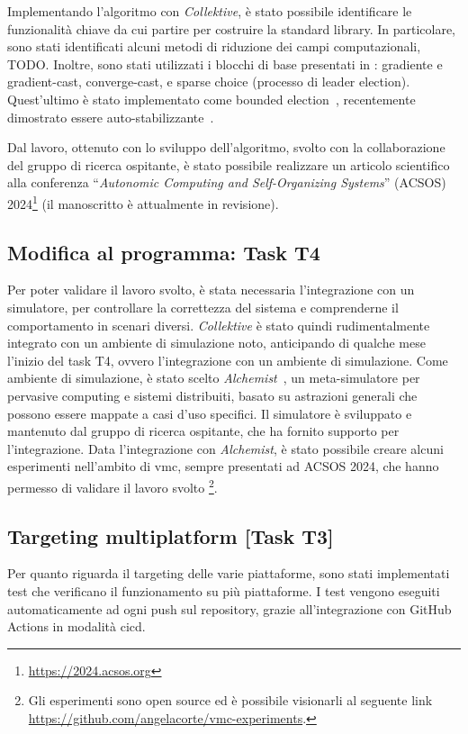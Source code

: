 \documentclass[13pt, a4paper]{article}
\newcommand{\ck}{\emph{Collektive}}
\begin{document}
Implementando l'algoritmo con \ck{},
è stato possibile identificare le funzionalità chiave da cui partire per costruire la standard library.
%
In particolare,
sono stati identificati alcuni metodi di riduzione dei campi computazionali, TODO.
%
Inoltre, sono stati utilizzati i blocchi di base presentati in \cite{TOMACS}:
gradiente e gradient-cast, converge-cast, e sparse choice (processo di leader election).
%
Quest'ultimo è stato implementato come bounded election~\cite{ACSOS},
recentemente dimostrato essere auto-stabilizzante~\cite{Dijkstra}.

Dal lavoro,
ottenuto con lo sviluppo dell'algoritmo,
svolto con la collaborazione del gruppo di ricerca ospitante,
è stato possibile realizzare un articolo scientifico alla conferenza
``\emph{Autonomic Computing and Self-Organizing Systems}'' (ACSOS) 2024\footnote{\url{https://2024.acsos.org}}
(il manoscritto è attualmente in revisione).

\subsection{Modifica al programma: Task T4}

Per poter validare il lavoro svolto, è stata necessaria l'integrazione con un simulatore,
    per controllare la correttezza del sistema e comprenderne il comportamento in scenari diversi.
%
\ck{} è stato quindi rudimentalmente integrato con un ambiente di simulazione noto,
anticipando di qualche mese l'inizio del task T4, ovvero l'integrazione con un ambiente di simulazione.
%
Come ambiente di simulazione, è stato scelto \emph{Alchemist}~\cite{PianiniJOS2013},
un meta-simulatore per pervasive computing e sistemi distribuiti,
basato su astrazioni generali che possono essere mappate a casi d'uso specifici.
%
Il simulatore è sviluppato e mantenuto dal gruppo di ricerca ospitante,
che ha fornito supporto per l'integrazione.
%
Data l'integrazione con \emph{Alchemist}, è stato possibile creare alcuni esperimenti nell'ambito di \ac{vmc},
    sempre presentati ad ACSOS 2024, che hanno permesso di validare il lavoro svolto \footnote{
    Gli esperimenti sono open source ed è possibile visionarli al seguente link \url{https://github.com/angelacorte/vmc-experiments}.
}.

\subsection{Targeting multiplatform [Task T3]}\label{subsec:task-t3-[targeting-multiplatform]}
Per quanto riguarda il targeting delle varie piattaforme,
    sono stati implementati test che verificano il funzionamento su più piattaforme.
%
I test vengono eseguiti automaticamente ad ogni push sul repository, grazie all'integrazione con GitHub Actions in modalità \ac{cicd}.
\end{document}
